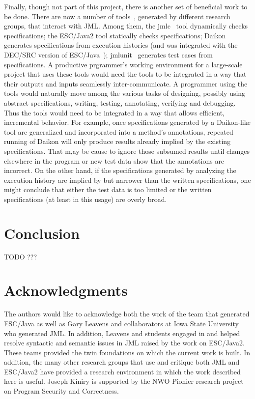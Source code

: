 \documentclass{acm_proc_article-sp}
\begin{document}
Finally, though not part of this project, there is another set of beneficial
work to be done.  There are now a number of tools~\cite{Burdy-etal03},
generated by different research groups, that interact with JML.  Among
them, the jmlc~\cite{Cheon-Leavens02b} tool dynamically checks
specifications; the ESC/Java2 tool statically checks specifications;
Daikon generates specifications from execution histories (and was
integrated with the DEC/SRC version of ESC/Java~\cite{NimmerErnst01});
jmlunit~\cite{Cheon-Leavens02} generates test cases from
specifications.  A productive prgrammer's working environment for a
large-scale project that uses these tools would need the tools to be integrated
in a way that their outputs and inputs seamlessly inter-communicate.
A programmer using the tools would naturally move among the 
various tasks of designing, possibly using abstract specifications, 
writing, testing, annotating, verifying and debugging.  Thus the tools
would need to be integrated in a way that allows efficient, incremental
behavior.  For example, once specifications generated by a Daikon-like
tool are generalized and incorporated into a method's annotations,
repeated running of Daikon will only produce results already implied by
the existing specifications.  That m,ay be cause to ignore those
subsumed results until changes elsewhere in the program or new test
data show that the annotations are incorrect.  On the other hand, if the
specifications generated by analyzing the execution history are 
implied by but narrower than the written specifications, one might conclude
that either the test data is too limited or the written specifications (at least
in this usage) are overly broad.

\section{Conclusion}
TODO ???

\section{Acknowledgments}
The authors would like to acknowledge both the work of the team that
generated ESC/Java as well as Gary Leavens and collaborators at Iowa
State University who generated JML.  In addition, Leavens and students
engaged in
and helped resolve syntactic and semantic issues in JML raised by 
the work on ESC/Java2.
These teams provided the twin
foundations on which the current work is built.  In addition, the many
other research groups that use and critique both JML and ESC/Java2
have provided a research environment in which the work described here
is useful.  Joseph Kiniry is supported by the NWO Pionier research
project on Program Security and Correctness.

%

  
%
%
\balancecolumns

\end{document}
